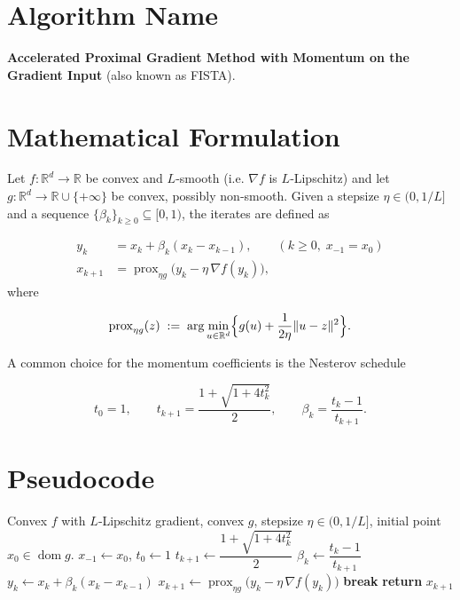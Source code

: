 \documentclass{article}
\newcommand{\prox}{\operatorname{prox}}
\newcommand{\grad}{\nabla}
\begin{document}
\section*{Algorithm Name}
\textbf{Accelerated Proximal Gradient Method with Momentum on the Gradient Input}  
(also known as FISTA).

\section*{Mathematical Formulation}
Let $f:\mathbb{R}^{d}\to\mathbb{R}$ be convex and $L$‑smooth (i.e. $\grad f$ is $L$‑Lipschitz) and let $g:\mathbb{R}^{d}\to\mathbb{R}\cup\{+\infty\}$ be convex, possibly non‑smooth.  
Given a stepsize $\eta\in(0,1/L]$ and a sequence $\{\beta_k\}_{k\ge 0}\subseteq[0,1)$, the iterates are defined as  

\[
\begin{aligned}
y_k &= x_k + \beta_k (x_k - x_{k-1}), \qquad (k\ge 0,\; x_{-1}=x_0)\\[4pt]
x_{k+1} &= \prox_{\eta g}\!\bigl(y_k - \eta \,\grad f(y_k)\bigr),
\end{aligned}
\]
where  

\[
\prox_{\eta g}(z) \;:=\; \arg\min_{u\in\mathbb{R}^{d}}\Bigl\{ g(u)+\frac{1}{2\eta}\|u-z\|^{2}\Bigr\}.
\]

A common choice for the momentum coefficients is the Nesterov schedule  

\[
t_0=1,\qquad 
t_{k+1}= \frac{1+\sqrt{1+4t_{k}^{2}}}{2},\qquad 
\beta_k = \frac{t_k-1}{t_{k+1}} .
\]

\section*{Pseudocode}
\begin{algorithm}[H]
\caption{Accelerated Proximal Gradient (APG)}\label{alg:apg}
\begin{algorithmic}[1]
\Require Convex $f$ with $L$‑Lipschitz gradient, convex $g$, stepsize $\eta\in(0,1/L]$, initial point $x_0\in\operatorname{dom} g$.
\State $x_{-1}\gets x_0$, $t_0\gets 1$
    \State $t_{k+1}\gets \dfrac{1+\sqrt{1+4t_k^2}}{2}$
    \State $\beta_k\gets \dfrac{t_k-1}{t_{k+1}}$
    \State $y_k \gets x_k + \beta_k (x_k - x_{k-1})$
    \State $x_{k+1} \gets \prox_{\eta g}\!\bigl(y_k - \eta \,\grad f(y_k)\bigr)$
        \State \textbf{break}
    \EndIf
\EndFor
\State \textbf{return} $x_{k+1}$
\end{algorithmic}
\end{algorithm}
\end{document}
